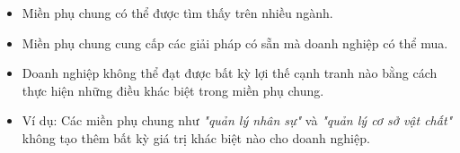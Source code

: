 \begin{itemize}
    \item  Miền phụ chung có thể được tìm thấy trên nhiều ngành.

    \item   Miền phụ chung cung cấp các giải pháp có sẵn mà doanh nghiệp có thể mua.

    \item   Doanh nghiệp không thể đạt được bất kỳ lợi thế cạnh tranh nào bằng cách thực hiện những điều khác biệt trong miền phụ chung.

    \item   Ví dụ: Các miền phụ chung như \textit{"quản lý nhân sự"} và \textit{"quản lý cơ sở vật chất"} không tạo thêm bất kỳ giá trị khác biệt nào cho doanh nghiệp.
\end{itemize}